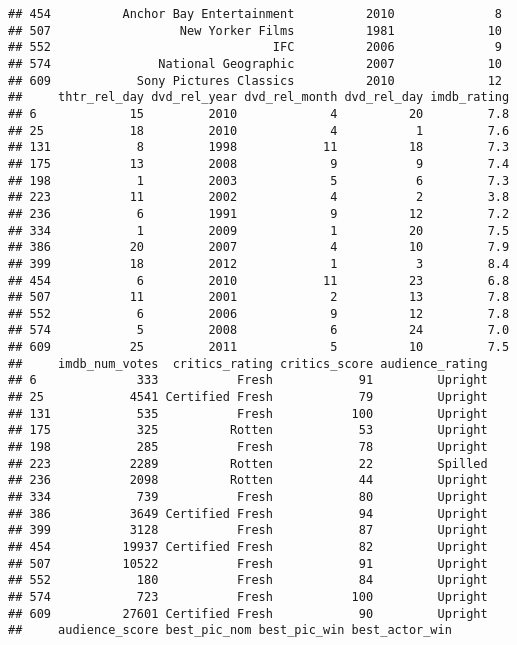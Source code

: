 \documentclass[]{article}
\begin{document}
\begin{verbatim}
## 454          Anchor Bay Entertainment          2010              8
## 507                  New Yorker Films          1981             10
## 552                               IFC          2006              9
## 574               National Geographic          2007             10
## 609            Sony Pictures Classics          2010             12
##     thtr_rel_day dvd_rel_year dvd_rel_month dvd_rel_day imdb_rating
## 6             15         2010             4          20         7.8
## 25            18         2010             4           1         7.6
## 131            8         1998            11          18         7.3
## 175           13         2008             9           9         7.4
## 198            1         2003             5           6         7.3
## 223           11         2002             4           2         3.8
## 236            6         1991             9          12         7.2
## 334            1         2009             1          20         7.5
## 386           20         2007             4          10         7.9
## 399           18         2012             1           3         8.4
## 454            6         2010            11          23         6.8
## 507           11         2001             2          13         7.8
## 552            6         2006             9          12         7.8
## 574            5         2008             6          24         7.0
## 609           25         2011             5          10         7.5
##     imdb_num_votes  critics_rating critics_score audience_rating
## 6              333           Fresh            91         Upright
## 25            4541 Certified Fresh            79         Upright
## 131            535           Fresh           100         Upright
## 175            325          Rotten            53         Upright
## 198            285           Fresh            78         Upright
## 223           2289          Rotten            22         Spilled
## 236           2098          Rotten            44         Upright
## 334            739           Fresh            80         Upright
## 386           3649 Certified Fresh            94         Upright
## 399           3128           Fresh            87         Upright
## 454          19937 Certified Fresh            82         Upright
## 507          10522           Fresh            91         Upright
## 552            180           Fresh            84         Upright
## 574            723           Fresh           100         Upright
## 609          27601 Certified Fresh            90         Upright
##     audience_score best_pic_nom best_pic_win best_actor_win

\end{verbatim}
\end{document}
